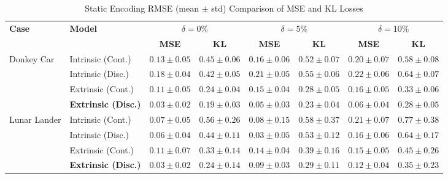 \documentclass[sigconf]{acmart}
\begin{document}
\begin{table}[ht!]
\centering
\caption{Static Encoding RMSE (mean \(\pm\) std) Comparison of MSE and KL Losses}
\label{tab:static_rmse_all_noise}
\footnotesize %
\begin{tabular}{@{}llcccccc@{}}
\toprule
\multirow{2}{*}{\textbf{Case}} & \multirow{2}{*}{\textbf{Model}} & \multicolumn{2}{c}{\textbf{$\delta = 0\%$}} & \multicolumn{2}{c}{\textbf{$\delta = 5\%$}} & \multicolumn{2}{c}{\textbf{$\delta = 10\%$}} \\
\cmidrule(lr){3-4} \cmidrule(lr){5-6} \cmidrule(lr){7-8}
 &  & \textbf{MSE} & \textbf{KL} & \textbf{MSE} & \textbf{KL} & \textbf{MSE} & \textbf{KL} \\ \midrule
\multirow{4}{*}{Donkey Car} & Intrinsic (Cont.) & $0.13 \pm 0.05$ & $0.45 \pm 0.06$ & $0.16 \pm 0.06$ & $0.52 \pm 0.07$ & $0.20 \pm 0.07$ & $0.58 \pm 0.08$ \\
 & Intrinsic (Disc.) & $0.18 \pm 0.04$ & $0.42 \pm 0.05$ & $0.21 \pm 0.05$ & $0.55 \pm 0.06$ & $0.22 \pm 0.06$ & $0.64 \pm 0.07$ \\
 & Extrinsic (Cont.) & $0.11 \pm 0.05$ & $0.24 \pm 0.04$ & $0.15 \pm 0.04$ & $0.28 \pm 0.05$ & $0.16 \pm 0.05$ & $0.33 \pm 0.06$ \\
 & \textbf{Extrinsic (Disc.)} & {$0.03 \pm 0.02$} & $0.19 \pm 0.03$ & {$0.05 \pm 0.03$} & $0.23 \pm 0.04$ & {$0.06 \pm 0.04$} & $0.28 \pm 0.05$ \\ \midrule
\multirow{4}{*}{Lunar Lander} & Intrinsic (Cont.) & $0.07 \pm 0.05$ & $0.56 \pm 0.26$ & $0.08 \pm 0.15$ & {$0.58 \pm 0.37$} & $0.21 \pm 0.07$ & $0.77 \pm 0.38$ \\
 & Intrinsic (Disc.) & $0.06 \pm 0.04$ & $0.44 \pm 0.11$ & $0.03 \pm 0.05$ & $0.53 \pm 0.12$ & $0.16 \pm 0.06$ & $0.64 \pm 0.17$ \\
 & Extrinsic (Cont.) & $0.11 \pm 0.07$ & $0.33 \pm 0.14$ & $0.14 \pm 0.04$ & $0.39 \pm 0.16$ & $0.15 \pm 0.05$ & $0.45 \pm 0.26$ \\
 & \textbf{Extrinsic (Disc.)} & \textbf{$0.03 \pm 0.02$} & $0.24 \pm 0.14$ & \textbf{$0.09 \pm 0.03$} & $0.29 \pm 0.11$ & \textbf{$0.12 \pm 0.04$} & $0.35 \pm 0.23$ \\ \bottomrule
\end{tabular}
\end{table}
\end{document}
